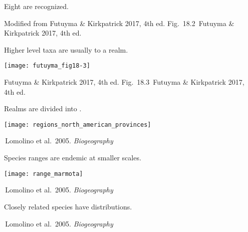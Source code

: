 \documentclass[t,handout]{beamer}  %
\newcommand{\futuyma}[1]{%
	\ifthenelse{\isempty{#1}}%
	{Futuyma \& Kirkpatrick 2017, 4th ed.}%
	{Fig.~#1~Futuyma \& Kirkpatrick 2017, 4th ed.}%
}
\newcommand{\backskip}{\vspace{-0.5\baselineskip}}
\begin{document}

{
\begin{frame}[b]

\end{frame}
}

{
\begin{frame}{Eight  are recognized.}

\tinyfill Modified from \futuyma{18.2}
\end{frame}
}



\begin{frame}{Higher level taxa are usually  to a realm.}

\backskip

\texttt{[image: futuyma\_fig18-3]}
	

\tinyfill \futuyma{18.3}

\end{frame}


\begin{frame}{Realms are divided into .}

\backskip

\centering

\texttt{[image: regions\_north\_american\_provinces]}
	

\tinyfill \textcopyright\,Lomolino et al.~2005. \emph{Biogeography}

\end{frame}



\begin{frame}{Species ranges are endemic at smaller scales.}

\backskip

\texttt{[image: range\_marmota]}
	

\tinyfill \textcopyright\,Lomolino et al.~2005. \emph{Biogeography}


\end{frame}

%
{
\begin{frame}[t]{Closely related species have  distributions.}

\tinyfill \textcopyright\,Lomolino et al.~2005. \emph{Biogeography}

\end{frame}
}
%
%
\end{document}
